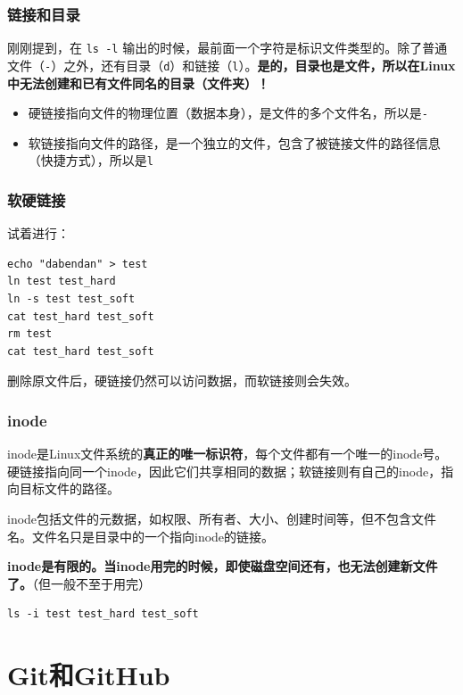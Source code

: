 \documentclass{ctexbeamer}
\begin{document}
\begin{frame}
    \frametitle{链接和目录}

    刚刚提到，在 \texttt{ls -l} 输出的时候，最前面一个字符是标识文件类型的。除了普通文件（\texttt{-}）之外，还有目录（\texttt{d}）和链接（\texttt{l}）。\textbf{是的，目录也是文件，所以在Linux中无法创建和已有文件同名的目录（文件夹）！}

    \hspace{2em}

    \begin{itemize}
        \item 硬链接指向文件的物理位置（数据本身），是文件的多个文件名，所以是\texttt{-}
        \item 软链接指向文件的路径，是一个独立的文件，包含了被链接文件的路径信息（快捷方式），所以是\texttt{l}
    \end{itemize}

\end{frame}

\begin{frame}[fragile]
    \frametitle{软硬链接}

    试着进行：
\begin{verbatim}
echo "dabendan" > test
ln test test_hard
ln -s test test_soft
cat test_hard test_soft
rm test
cat test_hard test_soft
    \end{verbatim}
    删除原文件后，硬链接仍然可以访问数据，而软链接则会失效。

\end{frame}

\begin{frame}[fragile]
    \frametitle{inode}

    inode是Linux文件系统的\textbf{真正的唯一标识符}，每个文件都有一个唯一的inode号。硬链接指向同一个inode，因此它们共享相同的数据；软链接则有自己的inode，指向目标文件的路径。

    inode包括文件的元数据，如权限、所有者、大小、创建时间等，但不包含文件名。文件名只是目录中的一个指向inode的链接。

    \textbf{inode是有限的。当inode用完的时候，即使磁盘空间还有，也无法创建新文件了。}（但一般不至于用完）

\begin{verbatim}
ls -i test test_hard test_soft
\end{verbatim}

\end{frame}

\section{Git和GitHub}
\frame{\sectionpage}
\end{document}
